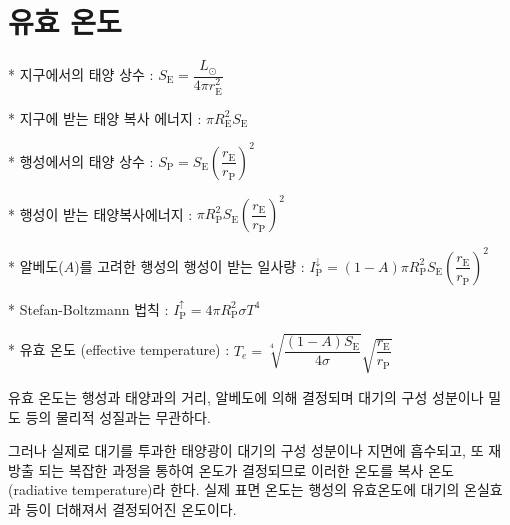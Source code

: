 \section{유효 온도}






* 지구에서의 태양 상수 : $ S_{\mathrm{E}} = \dfrac{L_{\odot}}{4\pi r_{\mathrm{E}}^{2}}$

* 지구에 받는 태양 복사 에너지 : $ \pi R_{\mathrm{E}}^{2} S_{\mathrm{E}}$

* 행성에서의 태양 상수 : $ S_{\mathrm{P}} = S_{\mathrm{E}}\left(\dfrac{r_{\mathrm{E}}}{r_{\mathrm{P}}}\right)^{2}$

* 행성이 받는 태양복사에너지 : $ \pi R_{\mathrm{P}}^{2} S_{\mathrm{E}}\left(\dfrac{r_{\mathrm{E}}}{r_{\mathrm{P}}}\right)^{2}$

* 알베도($A$)를 고려한 행성의 행성이 받는 일사량 : $ I_{\mathrm{P}}^{\downarrow} = (1-A)\pi R_{\mathrm{P}}^{2} S_{\mathrm{E}}\left(\dfrac{r_{\mathrm{E}}}{r_{\mathrm{P}}}\right)^{2}$

* Stefan-Boltzmann 법칙 : $ I_{\mathrm{P}}^{\uparrow} = 4\pi R_{\mathrm{P}}^{2} \sigma T^{4}$

* 유효 온도 (effective temperature) : $ T_{e} = \sqrt[4]{\dfrac{(1-A) S_{\mathrm{E}}}{4 \sigma}} \sqrt{\dfrac{r_{\mathrm{E}}}{r_{\mathrm{P}}}} $


유효 온도는 행성과 태양과의 거리, 알베도에 의해 결정되며 대기의 구성 성분이나 밀도 등의 물리적 성질과는 무관하다.

그러나 실제로 대기를 투과한 태양광이 대기의 구성 성분이나 지면에 흡수되고, 또 재방출 되는 복잡한 과정을 통하여 온도가 결정되므로 이러한 온도를 복사 온도(radiative temperature)라 한다. 
실제 표면 온도는 행성의 유효온도에 대기의 온실효과 등이 더해져서 결정되어진 온도이다. 

